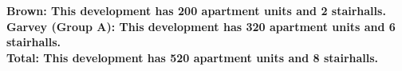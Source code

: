 \bf{Brown}: This development has 200 apartment units and 2 stairhalls.\\\bf{Garvey (Group A)}: This development has 320 apartment units and 6 stairhalls.\\\bf{Total}: This development has 520 apartment units and 8 stairhalls.\\